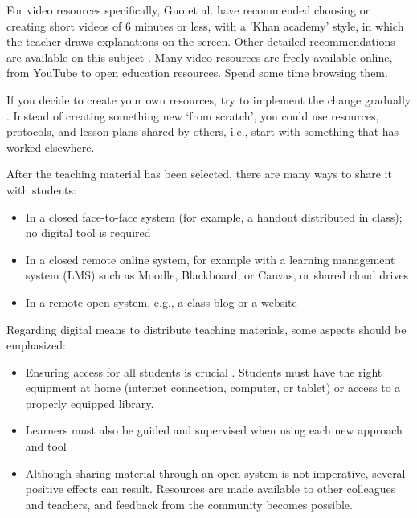 \documentclass[10pt,letterpaper]{article}
\begin{document}
For video resources specifically, Guo et al. \cite{guo_how_2014} have recommended choosing or creating short videos of 6 minutes or less, 
with a 'Khan academy' style, in which the teacher draws explanations on the screen. Other detailed recommendations are available 
on this subject \cite{mayer_cambridge_2005}. Many video resources are freely available online, from YouTube to open education
resources. Spend some time browsing them.

If you decide to create your own resources, try to implement the change gradually \cite{lo_critical_2017}. 
Instead of creating something new ‘from scratch’, you could use resources, protocols, and lesson plans 
shared by others, i.e., start with something that has worked elsewhere.

After the teaching material has been selected, there are many ways to share it with students:

\begin{itemize}

\item In a closed face-to-face system (for example, a handout distributed in class); no digital tool is required

\item In a closed remote online system, for example with a learning management system (LMS) such as Moodle, Blackboard, or Canvas, 
or shared cloud drives

\item In a remote open system, e.g., a class blog or a website

\end{itemize}

Regarding digital means to distribute teaching materials, some aspects should be emphasized:

\begin{itemize}

\item Ensuring access for all students is crucial \cite{lo_critical_2017}. 
Students must have the right equipment at home (internet connection, computer, or tablet) 
or access to a properly equipped library.

\item Learners must also be guided and supervised when using each new approach and tool \cite{lo_critical_2017}.

\item Although sharing material through an open system is not imperative, several positive effects can result. 
Resources are made available to other colleagues and teachers, and feedback from the community becomes possible.

\end{itemize}
\end{document}
